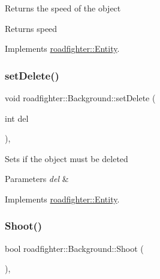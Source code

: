 Returns the speed of the object \begin{DoxyReturn}{Returns}
speed 
\end{DoxyReturn}


Implements \hyperlink{classroadfighter_1_1Entity_ad3760184d764a61922e1db7d98501ee4}{roadfighter\+::\+Entity}.

\mbox{\label{classroadfighter_1_1Background_acb4cdc56872d164b297b5655124df54d}} 
\subsubsection{\texorpdfstring{set\+Delete()}{setDelete()}}
{\footnotesize\ttfamily void roadfighter\+::\+Background\+::set\+Delete (\begin{DoxyParamCaption}\item[{int}]{del }\end{DoxyParamCaption})\hspace{0.3cm}{\ttfamily [override]}, {\ttfamily [virtual]}}

Sets if the object must be deleted 
\begin{DoxyParams}{Parameters}
{\em del} & \\
\hline
\end{DoxyParams}


Implements \hyperlink{classroadfighter_1_1Entity_a07e973f0fa941a69e749629716877692}{roadfighter\+::\+Entity}.

\mbox{\label{classroadfighter_1_1Background_a1482152bca4207b44f1ce1c2c5af5847}} 
\subsubsection{\texorpdfstring{Shoot()}{Shoot()}}
{\footnotesize\ttfamily bool roadfighter\+::\+Background\+::\+Shoot (\begin{DoxyParamCaption}{ }\end{DoxyParamCaption})\hspace{0.3cm}{\ttfamily [override]}, {\ttfamily [virtual]}}

